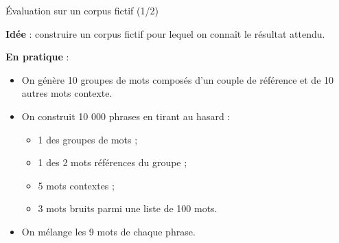 \documentclass[10pt,xcolor=table,color={dvipsnames,usenames},ignorenonframetext,usepdftitle=false,french]{beamer}
\begin{document}
\begin{frame}{Évaluation sur un corpus fictif (1/2)}
\protect\hypertarget{uxe9valuation-sur-un-corpus-fictif-12}{}

\textbf{Idée} : construire un corpus fictif pour lequel on connaît le
résultat attendu.

\textbf{En pratique} :

\begin{itemize}
\item On génère 10 groupes de mots composés d'un couple de référence et de 10 autres mots contexte.
\item On construit 10 000 phrases en tirant au hasard :
\begin{itemize}
\item 1 des groupes de mots ;
\item 1 des 2 mots \og références \fg{} du groupe ;
\item 5 mots contextes ;
\item 3 mots bruits parmi une liste de 100 mots.
\end{itemize}
\item On mélange les 9 mots de chaque phrase.
\end{itemize}

\end{frame}
\end{document}
